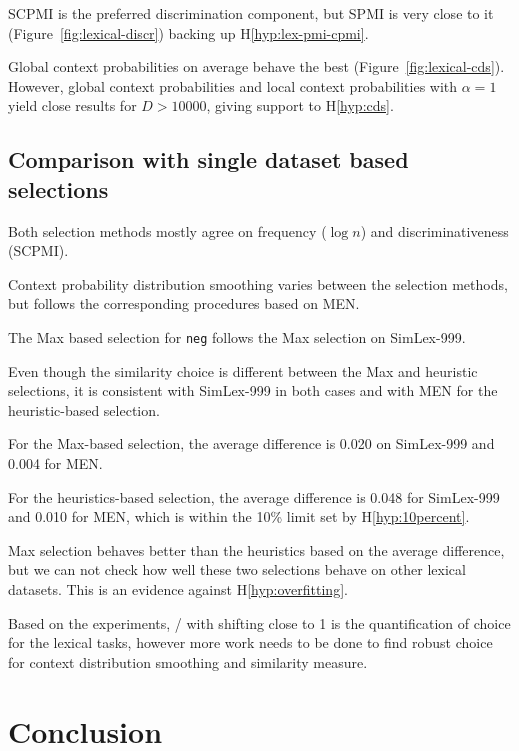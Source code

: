 SCPMI is the preferred discrimination component, but SPMI is very close to it (Figure~\ref{fig:lexical-discr}) backing up H\ref{hyp:lex-pmi-cpmi}.


Global context probabilities on average behave the best (Figure~\ref{fig:lexical-cds}). However, global context probabilities and local context probabilities with $\alpha = 1$ yield close results for $D > 10000$, giving support to H\ref{hyp:cds}.



\subsection{Comparison with single dataset based selections}

Both selection methods mostly agree on frequency ($\log n$) and discriminativeness (SCPMI).

Context probability distribution smoothing varies between the selection methods, but follows the corresponding procedures based on MEN.

The Max based selection for \texttt{neg} follows the Max selection on SimLex-999.

Even though the similarity choice is different between the Max and heuristic selections, it is consistent with SimLex-999 in both cases and with MEN for the heuristic-based selection.

For the Max-based selection, the average difference is 0.020 on SimLex-999 and 0.004 for MEN.

For the heuristics-based selection, the average difference is 0.048 for SimLex-999 and 0.010 for MEN, which is within the 10\% limit set by H\ref{hyp:10percent}.

Max selection behaves better than the heuristics based on the average difference, but we can not check how well these two selections behave on other lexical datasets. This is an evidence against H\ref{hyp:overfitting}.

Based on the experiments, \logNSCPMI/ with shifting close to 1 is the quantification of choice for the lexical tasks, however more work needs to be done to find robust choice for context distribution smoothing and similarity measure.

\section{Conclusion}
\label{sec:conclusion-lexical}

